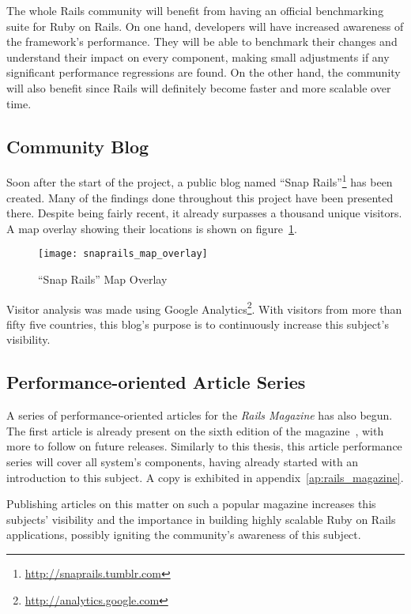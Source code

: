 The whole Rails community will benefit from having an official benchmarking suite for Ruby on Rails. On one hand, developers will have increased awareness of the framework's performance. They will be able to benchmark their changes and understand their impact on every component, making small adjustments if any significant performance regressions are found. On the other hand, the community will also benefit since Rails will definitely become faster and more scalable over time.


\subsection{Community Blog}
Soon after the start of the project, a public blog named ``Snap Rails''\footnote{\url{http://snaprails.tumblr.com}} has been created. Many of the findings done throughout this project have been presented there. Despite being fairly recent, it already surpasses a thousand unique visitors. A map overlay showing their locations is shown on figure~\ref{fig:snaprails_map_overlay}.
\begin{figure}[h!t]
  \centering
    \texttt{[image: snaprails\_map\_overlay]}
    \caption{``Snap Rails'' Map Overlay} \label{fig:snaprails_map_overlay}
\end{figure}
Visitor analysis was made using Google Analytics\footnote{\url{http://analytics.google.com}}. With visitors from more than fifty five countries, this blog's purpose is to continuously increase this subject's visibility.


\subsection{Performance-oriented Article Series}
A series of performance-oriented articles for the \textit{Rails Magazine} has also begun. The first article is already present on the sixth edition of the magazine~\cite{rails_magazine_6}, with more to follow on future releases. Similarly to this thesis, this article performance series will cover all system's components, having already started with an introduction to this subject. A copy is exhibited in appendix~\ref{ap:rails_magazine}.

Publishing articles on this matter on such a popular magazine increases this subjects' visibility and the importance in building highly scalable Ruby on Rails applications, possibly igniting the community's awareness of this subject.


